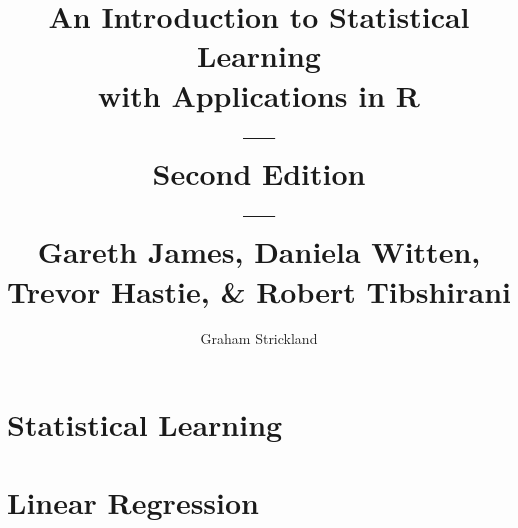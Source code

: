 \documentclass{article}
\title{
    An Introduction to Statistical Learning\\with Applications in R\\---\\
    Second Edition\\---\\Gareth James, Daniela Witten, Trevor Hastie, \& Robert Tibshirani
}
\author{Graham Strickland}
\numberwithin{figure}{section}
\begin{document}
\maketitle  

\setcounter{section}{1}
\section{Statistical Learning}


\section{Linear Regression}

\end{document}
